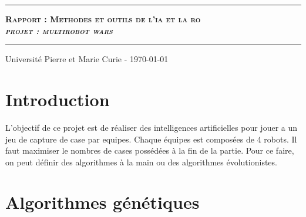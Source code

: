 \documentclass[11pt]{article}
\date{}
\author{\scshape Becirspahic Lucas}
\makeatletter
\renewcommand{\maketitle}{
\begin{titlepage}%
    \vspace*{7cm}
	\hrule
	\begin{center}
		{\bfseries \scshape {\huge Rapport : Methodes et outils de l'ia et la ro} \\[1em] {\itshape \LARGE  projet : multirobot wars}}
	\end{center}
	\vspace{1em}
	\hrule
	 \begin{center}
      \Large \@author \par
    \end{center}	
    \vfill
	\begin{center}
	Université Pierre et Marie Curie - \today
	\end{center}
    \end{titlepage}
}
\makeatother
\begin{document}
\maketitle




\section{Introduction}

L'objectif de ce  projet est de réaliser des intelligences artificielles pour jouer a un jeu de capture de case par equipes. Chaque équipes est composées de 4 robots. Il faut maximiser le nombres de cases possédées à la fin de la partie. Pour ce faire, on peut définir des algorithmes à la main ou des algorithmes évolutionistes.


\section{Algorithmes génétiques}
\end{document}
